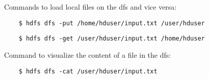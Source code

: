 Commands to load local files on the dfs and vice versa:

\begin{lstlisting}
    $ hdfs dfs -put /home/hduser/input.txt /user/hduser
\end{lstlisting}

\begin{lstlisting}
    $ hdfs dfs -get /user/hduser/input.txt /home/hduser
\end{lstlisting}


Command to visualize the content of a file in the dfs:

\begin{lstlisting}
    $ hdfs dfs -cat /user/hduser/input.txt
\end{lstlisting}
